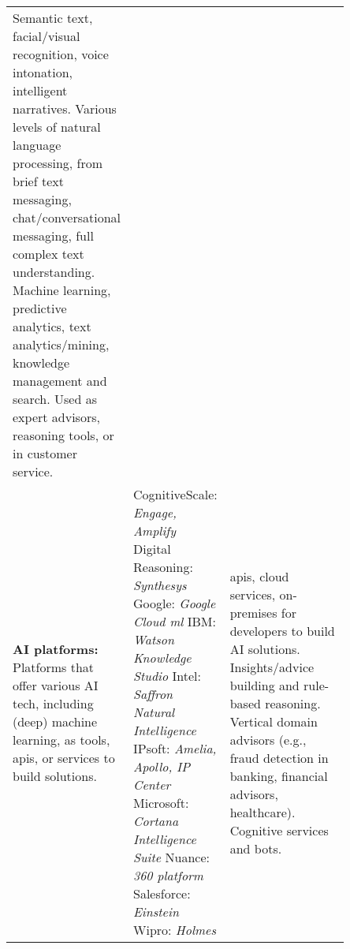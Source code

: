 {\begin{landscape}
\begin{table}
{\begin{tabular}{p{0.2\linewidth}|p{0.25\linewidth}p{0.4\linewidth}}
Semantic text, facial/visual recognition, voice intonation, intelligent narratives.\newline
Various levels of natural language processing, from brief text messaging, chat/conversational messaging, full complex text understanding.\newline
Machine learning, predictive analytics, text analytics/mining, knowledge management and search.\newline
Used as expert advisors, reasoning tools, or in customer service.\\

\textbf{AI platforms:}\newline
Platforms that offer various AI tech, including (deep) machine learning, as tools, \glspl{api}, or services to build solutions.&

CognitiveScale: \textit{Engage, Amplify}\newline
Digital Reasoning: \textit{Synthesys}\newline
Google: \textit{Google Cloud \gls{ml}}\newline
IBM: \textit{Watson Knowledge Studio}\newline
Intel: \textit{Saffron Natural Intelligence}\newline
IPsoft: \textit{Amelia, Apollo, IP Center}\newline
Microsoft: \textit{Cortana Intelligence Suite}\newline
Nuance: \textit{360 platform}\newline
Salesforce: \textit{Einstein}\newline
Wipro: \textit{Holmes}&

\glspl{api}, cloud services, on-premises for developers to build AI solutions. Insights/advice building and rule-based reasoning. Vertical domain advisors (e.g., fraud detection in banking, financial advisors, healthcare). Cognitive services and bots.\\

\bottomrule

\end{tabular}}
\end{table}\end{landscape}}